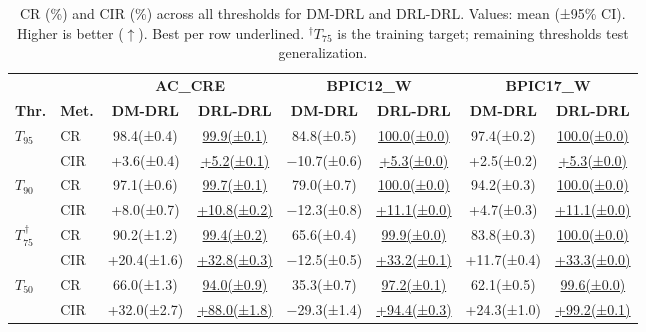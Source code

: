 \documentclass[journal,onecolumn]{IEEEtran}
\begin{document}
\begin{table}[!ht]
\centering\scriptsize
\setlength{\tabcolsep}{3pt}
\renewcommand{\arraystretch}{1.1}
\begin{tabular}{ll cc cc cc}
\toprule
& &
\multicolumn{2}{c}{\textbf{AC\_CRE}} &
\multicolumn{2}{c}{\textbf{BPIC12\_W}} &
\multicolumn{2}{c}{\textbf{BPIC17\_W}} \\
\cmidrule(lr){3-4}\cmidrule(lr){5-6}\cmidrule(lr){7-8}
\textbf{Thr.} & \textbf{Met.} &
\textbf{DM-DRL} & \textbf{DRL-DRL} &
\textbf{DM-DRL} & \textbf{DRL-DRL} &
\textbf{DM-DRL} & \textbf{DRL-DRL} \\
\midrule
\multirow{2}{*}{$T_{95}$}
  & CR  & 98.4{\tiny(±0.4)} & \underline{99.9{\tiny(±0.1)}} & 84.8{\tiny(±0.5)} & \underline{100.0{\tiny(±0.0)}} & 97.4{\tiny(±0.2)} & \underline{100.0{\tiny(±0.0)}} \\
  & CIR & +3.6{\tiny(±0.4)} & \underline{+5.2{\tiny(±0.1)}} & $-$10.7{\tiny(±0.6)} & \underline{+5.3{\tiny(±0.0)}} & +2.5{\tiny(±0.2)} & \underline{+5.3{\tiny(±0.0)}} \\
\midrule
\multirow{2}{*}{$T_{90}$}
  & CR  & 97.1{\tiny(±0.6)} & \underline{99.7{\tiny(±0.1)}} & 79.0{\tiny(±0.7)} & \underline{100.0{\tiny(±0.0)}} & 94.2{\tiny(±0.3)} & \underline{100.0{\tiny(±0.0)}} \\
  & CIR & +8.0{\tiny(±0.7)} & \underline{+10.8{\tiny(±0.2)}} & $-$12.3{\tiny(±0.8)} & \underline{+11.1{\tiny(±0.0)}} & +4.7{\tiny(±0.3)} & \underline{+11.1{\tiny(±0.0)}} \\
\midrule
\multirow{2}{*}{$T_{75}^{\,\dagger}$}
  & CR  & 90.2{\tiny(±1.2)} & \underline{99.4{\tiny(±0.2)}} & 65.6{\tiny(±0.4)} & \underline{99.9{\tiny(±0.0)}} & 83.8{\tiny(±0.3)} & \underline{100.0{\tiny(±0.0)}} \\
  & CIR & +20.4{\tiny(±1.6)} & \underline{+32.8{\tiny(±0.3)}} & $-$12.5{\tiny(±0.5)} & \underline{+33.2{\tiny(±0.1)}} & +11.7{\tiny(±0.4)} & \underline{+33.3{\tiny(±0.0)}} \\
\midrule
\multirow{2}{*}{$T_{50}$}
  & CR  & 66.0{\tiny(±1.3)} & \underline{94.0{\tiny(±0.9)}} & 35.3{\tiny(±0.7)} & \underline{97.2{\tiny(±0.1)}} & 62.1{\tiny(±0.5)} & \underline{99.6{\tiny(±0.0)}} \\
  & CIR & +32.0{\tiny(±2.7)} & \underline{+88.0{\tiny(±1.8)}} & $-$29.3{\tiny(±1.4)} & \underline{+94.4{\tiny(±0.3)}} & +24.3{\tiny(±1.0)} & \underline{+99.2{\tiny(±0.1)}} \\
\bottomrule
\end{tabular}
\caption[CR and CIR across all thresholds]{CR (\%) and CIR (\%) across all thresholds for DM-DRL and
DRL-DRL. Values: mean (±95\% CI). Higher is better ($\uparrow$).
Best per row underlined.
$^\dagger$$T_{75}$ is the training target; remaining thresholds
test generalization.}
\label{tab:compliance_all}
\end{table}
\end{document}
